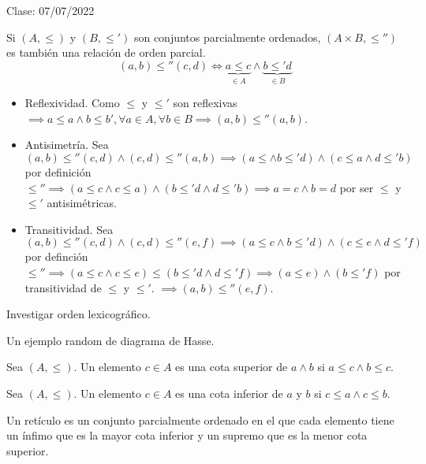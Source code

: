 Clase: 07/07/2022

\begin{teorema}
    Si $(A,\leq)$ y $(B,\leq')$ son conjuntos parcialmente ordenados, $(A\times B,\leq'')$ es también una relación de orden parcial.
    $$(a,b)\leq'' (c,d)\iff \underbrace{a\leq c}_{\in A}\wedge \underbrace{b\leq ' d}_{\in B}$$
    \begin{dem}
        \begin{itemize}
            \item Reflexividad. Como $\leq$ y $\leq'$ son reflexivas $\implies a\leq a\wedge b\leq b',\forall a\in A,\forall b\in B\implies (a,b)\leq'' (a,b)$. 
            \item Antisimetría. Sea $(a,b)\leq'' (c,d)\wedge (c,d)\leq'' (a,b)\implies \left(a\leq \wedge b\leq' d\right)\wedge \left(c\leq a\wedge d\leq' b\right)$ por definición $\leq''\implies (a\leq c\wedge c\leq a)\wedge (b\leq' d\wedge d\leq' b)\implies a=c \wedge b=d$ por ser $\leq$ y $\leq'$ antisimétricas.
            \item Transitividad. Sea $(a,b)\leq '' (c,d)\wedge (c,d)\leq'' (e,f)\implies (a\leq c \wedge b\leq' d)\wedge (c\leq e\wedge d\leq' f)$ por definción $\leq '' \implies (a\leq c\wedge c\leq e)\leq (b\leq' d\wedge d\leq'f)\implies (a\leq e)\wedge (b\leq'f )$ por transitividad de $\leq$ y $\leq'$. $\implies (a,b)\leq '' (e,f)$.
        \end{itemize}
    \end{dem}
\end{teorema}

\begin{cajita}
    Investigar orden lexicográfico.
\end{cajita}

\begin{ejemplo}
    Un ejemplo random de diagrama de Hasse.
\end{ejemplo}


\begin{definicion}
    Sea $(A,\leq)$. Un elemento $c\in A$ es una cota superior de $a\wedge b$ si $a\leq c\wedge b\leq c$.
\end{definicion}

\begin{definicion}
    Sea $(A,\leq)$. Un elemento  $c\in A$ es una cota inferior de $a$ y $b$ si $c\leq a\wedge c\leq b$.
\end{definicion}

\begin{definicion}
    Un retículo es un conjunto parcialmente ordenado en el que cada elemento tiene un ínfimo que es la mayor cota inferior y un supremo que es la menor cota superior.
\end{definicion}

